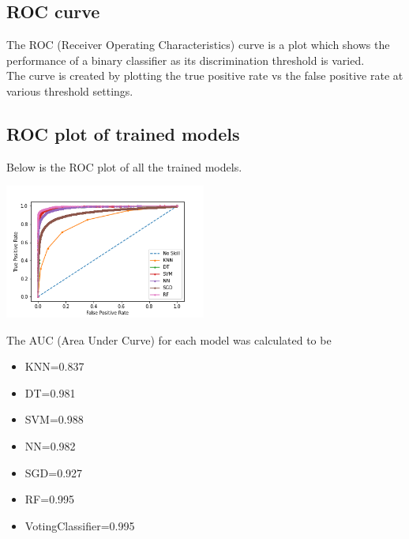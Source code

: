 \subsection{ROC curve}
The ROC (Receiver Operating Characteristics) curve is a plot which shows the performance of a binary classifier as its discrimination threshold is varied.\\
The curve is created by plotting the true positive rate vs the false positive rate at various threshold settings.

\subsection{ROC plot of trained models}
Below is the ROC plot of all the trained models.
\begin{center}
    \captionsetup{type=figure}
    \includegraphics[width=250px]{AUC.png}
\end{center}

The AUC (Area Under Curve) for each model was calculated to be 
\begin{itemize}
    \item KNN=0.837
    \item DT=0.981
    \item SVM=0.988
    \item NN=0.982
    \item SGD=0.927
    \item RF=0.995
    \item VotingClassifier=0.995
\end{itemize}



